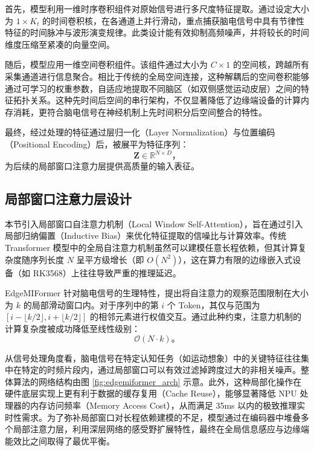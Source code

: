 首先，模型利用一维时序卷积组件对原始信号进行多尺度特征提取。通过设定大小为 $1 \times K_t$ 的时间卷积核，在各通道上并行滑动，重点捕获脑电信号中具有节律性特征的时间脉冲与波形演变规律。此类设计能有效抑制高频噪声，并将较长的时间维度压缩至紧凑的向量空间。

随后，模型应用一维空间卷积组件。该组件通过大小为 $C \times 1$ 的空间核，跨越所有采集通道进行信息聚合。相比于传统的全局空间连接，这种解耦后的空间卷积能够通过可学习的权重参数，自适应地提取不同脑区（如双侧感觉运动皮层）之间的特征拓扑关系。这种先时间后空间的串行架构，不仅显著降低了边缘端设备的计算内存消耗，更符合脑电信号在神经机制上先时间积分后空间整合的特性。

最终，经过处理的特征通过层归一化（Layer Normalization）与位置编码（Positional Encoding）后，被展平为特征序列：
\begin{equation}
    \mathbf{Z} \in \mathbb{R}^{N \times D}，
    \label{eq:feature_sequence}
\end{equation}
为后续的局部窗口注意力层提供高质量的输入表征。

\subsection{局部窗口注意力层设计}
本节引入局部窗口自注意力机制（Local Window Self-Attention），旨在通过引入局部归纳偏置（Inductive Bias）来优化特征提取的信噪比与计算效率。传统 Transformer 模型中的全局自注意力机制虽然可以建模任意长程依赖，但其计算复杂度随序列长度 $N$ 呈平方级增长（即 $O(N^2)$），这在算力有限的边缘嵌入式设备（如 RK3568）上往往导致严重的推理延迟。

EdgeMIFormer 针对脑电信号的生理特性，提出将自注意力的观察范围限制在大小为 $k$ 的局部滑动窗口内。对于序列中的第 $i$ 个 Token，其仅与范围为 $[i - \lfloor k/2 \rfloor, i + \lfloor k/2 \rfloor]$ 的相邻元素进行权值交互。通过此种约束，注意力机制的计算复杂度被成功降低至线性级别：
\begin{equation}
    \mathcal{O}(N \cdot k)。
    \label{eq:complexity}
\end{equation}

从信号处理角度看，脑电信号在特定认知任务（如运动想象）中的关键特征往往集中在特定的时频片段内，通过局部窗口可以有效过滤掉跨度过大的非相关噪声。整体算法的网络结构由图 \ref{fig:edgemiformer_arch} 示意。此外，这种局部化操作在硬件底层实现上更有利于数据的缓存复用（Cache Reuse），能够显著降低 NPU 处理器的内存访问频率（Memory Access Cost），从而满足 35ms 以内的极致推理实时性需求。为了弥补局部窗口对长程依赖建模的不足，模型通过在编码器中堆叠多个局部注意力层，利用深层网络的感受野扩展特性，最终在全局信息感应与边缘端能效比之间取得了最优平衡。

